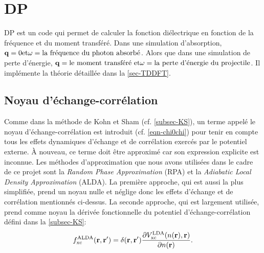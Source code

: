 \section{DP}
DP est un code qui permet de calculer la fonction diélectrique
en fonction de la fréquence et du moment transféré.
Dans une simulation d'absorption,
$\vb{q}=0 \text{et} \omega = \text{la fréquence du photon absorbé}$.
Alors que dans une simulation de perte d'énergie,
$\vb{q}= \text{le moment transféré et} \omega = \text{la perte d'énergie du projectile}$.
Il implémente la théorie détaillée dans la \cref{sec-TDDFT}.

\subsection{Noyau d'échange-corrélation}
Comme dans la méthode de Kohn et Sham (cf. \cref{subsec-KS}),
un terme appelé le noyau d'échange-corrélation est introduit (cf. \cref{eqn-chi0chi})
pour tenir en compte tous les effets dynamiques d'échange et de corrélation
exercés par le potentiel externe.
À nouveau, ce terme doit être approximé car son expression explicite est inconnue.
Les méthodes d'approximation que nous avons utilisées dans le cadre de ce projet sont
la \textit{Random Phase Approximation} (RPA) et
la \textit{Adiabatic Local Density Approximation} (ALDA).
La première approche, qui est aussi la plus simplifiée, prend un noyau nulle et
néglige donc les effets d'échange et de corrélation mentionnés ci-dessus.
La seconde approche, qui est largement utilisée,
prend comme noyau la dérivée fonctionnelle du potentiel d'échange-corrélation
défini dans la \cref{subsec-KS}:
\begin{equation*}
  f_{\textnormal{xc}}^{\textnormal{ALDA}}(\vb{r}, \vb{r}')
  = \delta(\vb{r}, \vb{r}')\pdv{V_{\textnormal{xc}}^{\textnormal{LDA}}(n(\vb{r}), \vb{r})}{n(\vb{r})}.
\end{equation*}
